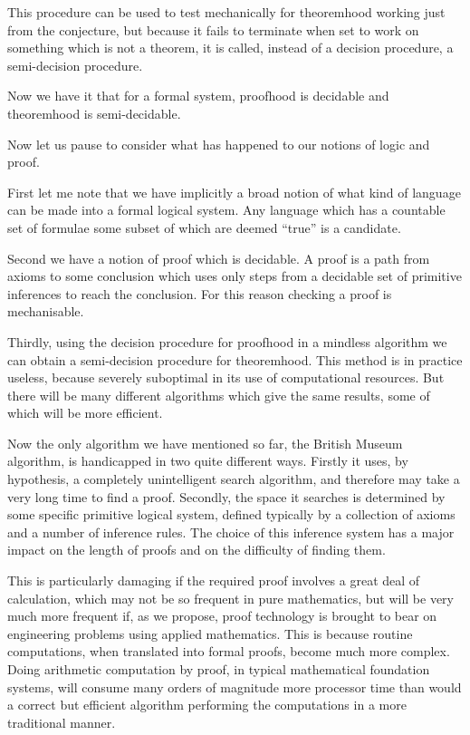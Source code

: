 This procedure can be used to test mechanically for theoremhood working just from the conjecture, but because it fails to terminate when set to work on something which is not a theorem, it is called, instead of a decision procedure, a semi-decision procedure.

Now we have it that for a formal system, proofhood is decidable and theoremhood is semi-decidable.

Now let us pause to consider what has happened to our notions of logic and proof.

First let me note that we have implicitly a broad notion of what kind of language can be made into a formal logical system.
Any language which has a countable set of formulae some subset of which are deemed ``true'' is a candidate.

Second we have a notion of proof which is decidable.
A proof is a path from axioms to some conclusion which uses only steps from a decidable set of primitive inferences to reach the conclusion.
For this reason checking a proof is mechanisable.

Thirdly, using the decision procedure for proofhood in a mindless algorithm we can obtain a semi-decision procedure for theoremhood.
This method is in practice useless, because severely suboptimal in its use of computational resources.
But there will be many different algorithms which give the same results, some of which will be more efficient.

Now the only algorithm we have mentioned so far, the British Museum algorithm, is handicapped in two quite different ways.
Firstly it uses, by hypothesis, a completely unintelligent search algorithm, and therefore may take a very long time to find a proof.
Secondly, the space it searches is determined by some specific primitive logical system, defined typically by a collection of axioms and a number of inference rules.
The choice of this inference system has a major impact on the length of proofs and on the difficulty of finding them.

This is particularly damaging if the required proof involves a great deal of calculation, which may not be so frequent in pure mathematics, but will be very much more frequent if, as we propose, proof technology is brought to bear on engineering problems using applied mathematics.
This is because routine computations, when translated into formal proofs, become much more complex.
Doing arithmetic computation by proof, in typical mathematical foundation systems, will consume many orders of magnitude more processor time than would a correct but efficient algorithm performing the computations in a more traditional manner.

